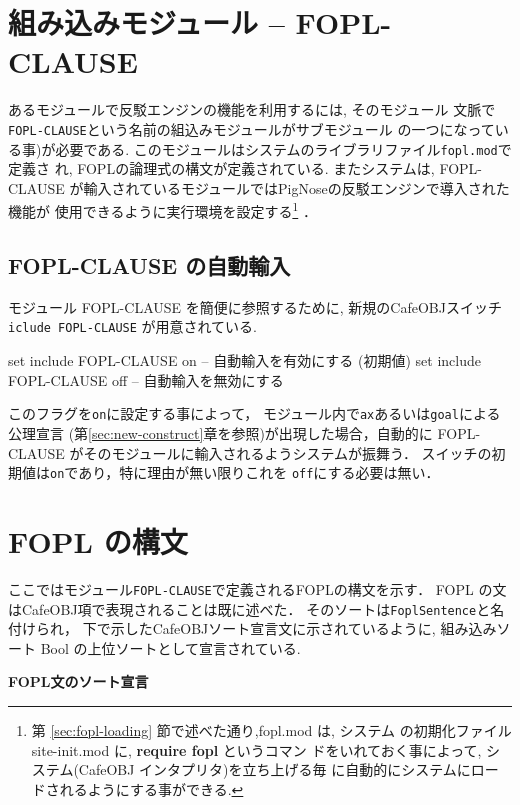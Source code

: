 \section{組み込みモジュール -- FOPL-CLAUSE}
\label{sec:builtin-fopl-clause}

あるモジュールで反駁エンジンの機能を利用するには, そのモジュール
文脈で\texttt{FOPL-CLAUSE}という名前の組込みモジュールがサブモジュール
の一つになっている事)が必要である. 
このモジュールはシステムのライブラリファイル\texttt{fopl.mod}で定義さ
れ, FOPLの論理式の構文が定義されている. またシステムは, FOPL-CLAUSE
が輸入されているモジュールではPigNoseの反駁エンジンで導入された機能が
使用できるように実行環境を設定する\footnote{%
第 \ref{sec:fopl-loading} 節で述べた通り,fopl.mod は, システム
  の初期化ファイル site-init.mod に, \textbf{require fopl} というコマン
  ドをいれておく事によって, システム(CafeOBJ インタプリタ)を立ち上げる毎
  に自動的にシステムにロードされるようにする事ができる.} ．

\subsection{FOPL-CLAUSE の自動輸入}

モジュール FOPL-CLAUSE を簡便に参照するために, 新規のCafeOBJスイッチ
\texttt{iclude FOPL-CLAUSE} が用意されている.

\begin{vvtm}
\begin{examplev}
  set include FOPL-CLAUSE on   -- 自動輸入を有効にする (初期値)
  set include FOPL-CLAUSE off  -- 自動輸入を無効にする
\end{examplev}
\end{vvtm}

このフラグを\texttt{on}に設定する事によって，
モジュール内で\texttt{ax}あるいは\texttt{goal}による公理宣言
(第\ref{sec:new-construct}章を参照)が出現した場合，自動的に
FOPL-CLAUSE がそのモジュールに輸入されるようシステムが振舞う．
スイッチの初期値は\texttt{on}であり，特に理由が無い限りこれを
\texttt{off}にする必要は無い．

\section{FOPL の構文}
\label{sec:fopl-syntax}

ここではモジュール\texttt{FOPL-CLAUSE}で定義されるFOPLの構文を示す．
FOPL の文はCafeOBJ項で表現されることは既に述べた．
そのソートは\texttt{FoplSentence}と名付けられ，
下で示したCafeOBJソート宣言文に示されているように, 組み込みソート Bool
の上位ソートとして宣言されている.  
\begin{description}
   \item \textbf{FOPL文のソート宣言}
     \begin{vvtm}
     \begin{simplev}
     \end{simplev}
   \end{vvtm}
 \end{description}

